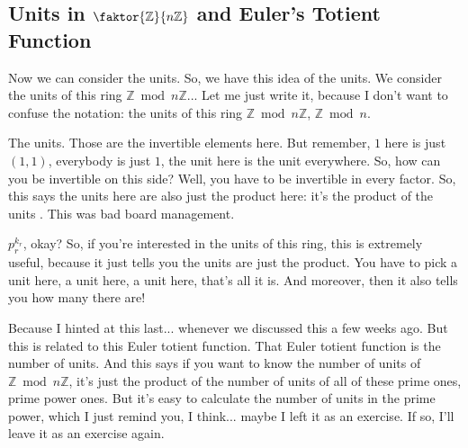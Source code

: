 \begin{hidden}
\end{hidden}

\subsection{Units in \texorpdfstring{$\faktor{\mathbb{Z}}{n\mathbb{Z}}$}{Z/nZ} and Euler's Totient Function}

\begin{speech}[00:17:15 - 00:19:16]
Now we can consider the units. So, we have this idea of the units. We consider the units of this ring  $\mathbb{Z} \bmod n\mathbb{Z}$... Let me just write it, because I don't want to confuse the notation: the units of this ring $\mathbb{Z} \bmod n\mathbb{Z}$, $\mathbb{Z} \bmod n$.

The units. Those are the invertible elements here. But remember, $1$ here is just $(1, 1)$, everybody is just $1$, the unit here is the unit everywhere. So, how can you be invertible on this side? Well, you have to be invertible in every factor. So, this says the units here are also just the product here: it's the product of the units .
 This was bad board management.

$p_r^{k_r}$, okay? So, if you're interested in the units of this ring, this is extremely useful, because it just tells you the units are just the product. You have to pick a unit here, a unit here, a unit here, that's all it is. And moreover, then it also tells you how many there are!

Because I hinted at this last... whenever we discussed this a few weeks ago. But this is related to this Euler totient function. That Euler totient function is the number of units. And this says if you want to know the number of units of $\mathbb{Z} \bmod n\mathbb{Z}$, it's just the product of the number of units of all of these prime ones, prime power ones. But it's easy to calculate the number of units in the prime power, which I just remind you, I think... maybe I left it as an exercise. If so, I'll leave it as an exercise again.
\end{speech}

